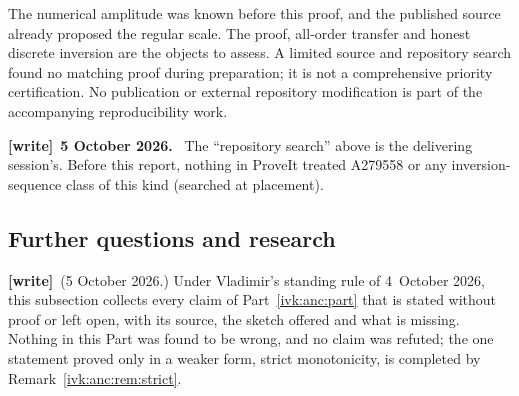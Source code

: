 \documentclass[11pt,letterpaper]{article}
\theoremstyle{remark}\newtheorem{remark}[theorem]{Remark}
\newenvironment{writenote}[1][]{\par\smallskip\begingroup\small
 \noindent\textbf{[write]}\if\relax\detokenize{#1}\relax\else~\textbf{#1.}\fi\ }%
 {\par\endgroup\smallskip}
\newcommand{\wtag}{\textup{\textbf{[write]}}}
\begin{document}
The numerical amplitude was known before this proof, and the
published source already proposed the regular scale. The proof,
all-order transfer and honest discrete inversion are the objects
to assess. A limited source and repository search found no matching
proof during preparation; it is not a comprehensive priority
certification. No publication or external repository modification
is part of the accompanying reproducibility work.
\begin{writenote}[5 October 2026]
The ``repository search'' above is the delivering session's. Before this report, nothing in ProveIt treated A279558 or any inversion-sequence class of this kind (searched at placement).
\end{writenote}

\subsection{Further questions and research}\label{ivk:anc:sub:further}
\wtag\ (5 October 2026.) Under Vladimir's standing rule of 4~October 2026, this subsection collects every claim of Part~\ref{ivk:anc:part} that is stated without proof or left open, with its source, the sketch offered and what is missing. Nothing in this Part was found to be wrong, and no claim was refuted; the one statement proved only in a weaker form, strict monotonicity, is completed by Remark~\ref{ivk:anc:rem:strict}.
\end{document}
